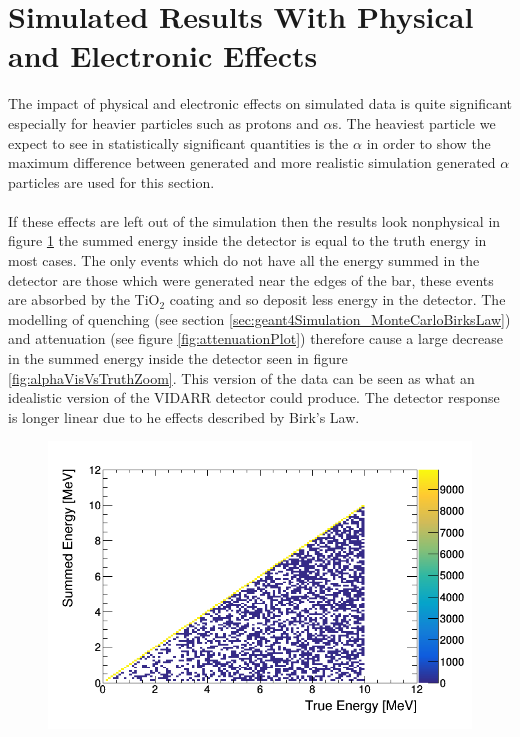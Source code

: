 \section{Simulated Results With Physical and Electronic Effects}\label{sec:geant4Simulation_resultsPhysicalElectronics}
The impact of physical and electronic effects on simulated data is quite significant especially for heavier particles such as protons and $\alpha$s. The heaviest particle we expect to see in statistically significant quantities is the $\alpha$ in order to show the maximum difference between generated and more realistic simulation generated $\alpha$ particles are used for this section. 
\\\\If these effects are left out of the simulation then the results look nonphysical in figure \ref{fig:alpha_summed_vs_truth} the summed energy inside the detector is equal to the truth energy in most cases. The only events which do not have all the energy summed in the detector are those which were generated near the edges of the bar, these events are absorbed by the TiO$_2$ coating and so deposit less energy in the detector. The modelling of quenching (see section \ref{sec:geant4Simulation_MonteCarloBirksLaw}) and attenuation (see figure \ref{fig:attenuationPlot}) therefore cause a large decrease in the summed energy inside the detector seen in figure \ref{fig:alphaVisVsTruthZoom}. This version of the data can be seen as what an idealistic version of the VIDARR detector could produce. The detector response is longer linear due to he effects described by Birk's Law. 
\begin{figure}[H]
 \centering
 \includegraphics[width=0.7\linewidth]{truth_vs_summed_alpha.png}
 \label{fig:alpha_summed_vs_truth}
\end{figure}
